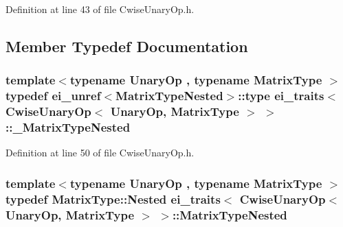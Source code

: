 Definition at line 43 of file Cwise\-Unary\-Op.\-h.



\subsection{Member Typedef Documentation}
\hypertarget{structei__traits_3_01_cwise_unary_op_3_01_unary_op_00_01_matrix_type_01_4_01_4_ab49cfa9426db6272a05759fe1494e0ee}{
\subsubsection[{\-\_\-\-Matrix\-Type\-Nested}]{\setlength{\rightskip}{0pt plus 5cm}template$<$typename Unary\-Op , typename Matrix\-Type $>$ typedef {\bf ei\-\_\-unref}$<${\bf Matrix\-Type\-Nested}$>$\-::{\bf type} {\bf ei\-\_\-traits}$<$ {\bf Cwise\-Unary\-Op}$<$ Unary\-Op, Matrix\-Type $>$ $>$\-::{\bf \-\_\-\-Matrix\-Type\-Nested}}}\label{structei__traits_3_01_cwise_unary_op_3_01_unary_op_00_01_matrix_type_01_4_01_4_ab49cfa9426db6272a05759fe1494e0ee}


Definition at line 50 of file Cwise\-Unary\-Op.\-h.

\hypertarget{structei__traits_3_01_cwise_unary_op_3_01_unary_op_00_01_matrix_type_01_4_01_4_a12560324ea835cf1da46c6d97489eb6e}{
\subsubsection[{Matrix\-Type\-Nested}]{\setlength{\rightskip}{0pt plus 5cm}template$<$typename Unary\-Op , typename Matrix\-Type $>$ typedef Matrix\-Type\-::\-Nested {\bf ei\-\_\-traits}$<$ {\bf Cwise\-Unary\-Op}$<$ Unary\-Op, Matrix\-Type $>$ $>$\-::{\bf Matrix\-Type\-Nested}}}\label{structei__traits_3_01_cwise_unary_op_3_01_unary_op_00_01_matrix_type_01_4_01_4_a12560324ea835cf1da46c6d97489eb6e}


